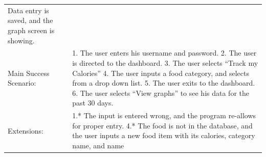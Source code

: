 \documentclass[10pt]{article}
\begin{document}
\begin{longtable}[]{@{}ll@{}}
\begin{minipage}[t]{0.47\columnwidth}
Data entry is saved, and the graph screen is showing.\strut
\end{minipage}\tabularnewline
\begin{minipage}[t]{0.48\columnwidth}\raggedright\strut
Main Success Scenario:\strut
\end{minipage} & \begin{minipage}[t]{0.48\columnwidth}\raggedright\strut
1.	The user enters his username and password.
2.	The user is directed to the dashboard.
3.	The user selects “Track my Calories”
4.	The user inputs a food category, and selects from a drop down list.
5.	The user exits to the dashboard.
6.	The user selects “View graphs” to see his data for the past 30 days.
\strut
\end{minipage}\tabularnewline
\begin{minipage}[t]{0.48\columnwidth}\raggedright\strut
Extensions:\strut
\end{minipage} & \begin{minipage}[t]{0.48\columnwidth}\raggedright\strut
1.* The input is entered wrong, and the program re-allows for proper entry.
4.* The food is not in the database, and the user inputs a new food item with its calories, category name, and name
\strut
\end{minipage}\tabularnewline
\bottomrule
\end{longtable}
\end{document}
